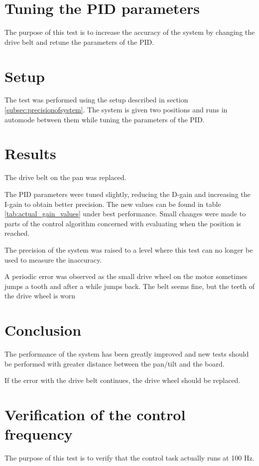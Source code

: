 \section{Tuning the PID parameters}
The purpose of this test is to increase the accuracy of the system by changing
the drive belt and retune the parameters of the PID.

\section*{Setup}
The test was performed using the setup described in section \ref{subsec:precisionofsystem}. The
system is given two positions and runs in automode between them while tuning the
parameters of the PID.

\section*{Results}
The drive belt on the pan was replaced.

The PID parameters were tuned slightly, reducing the D-gain and increasing the
I-gain to obtain better precision. The new values can be found in
table \ref{tab:actual_gain_values} under best performance. Small changes were made to
parts of the control algorithm concerned with evaluating when the position is reached.

The precision of the system was raised to a level where this test can no
longer be used to measure the inaccuracy. 

A periodic error was observed as the small drive wheel on the motor sometimes
jumps a tooth and after a while jumps back. The belt seems fine, but
the teeth of the drive wheel is worn

\section*{Conclusion}
The performance of the system has been greatly improved and new tests should be
performed with greater distance between the pan/tilt and the board. 

If the error with the drive belt continues, the drive wheel should be replaced.


\section{Verification of the control frequency}\label{subsec:control_freq}
The purpose of this test is to verify that the control task actually runs at 100 Hz.


